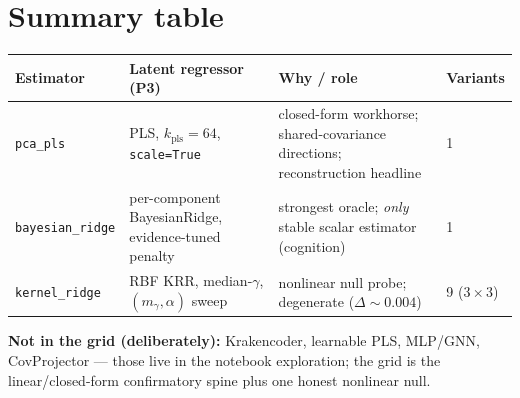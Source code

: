 \documentclass[11pt]{article}
\newcommand{\code}[1]{\texttt{#1}}
\begin{document}
\section*{Summary table}
\begin{center}
\renewcommand{\arraystretch}{1.3}
\begin{tabular}{@{}lp{3.3cm}p{6.0cm}p{2.4cm}@{}}
\toprule
\textbf{Estimator} & \textbf{Latent regressor (P3)} & \textbf{Why / role} & \textbf{Variants} \\
\midrule
\code{pca\_pls} & PLS, $k_{\mathrm{pls}}{=}64$, \texttt{scale=True} & closed-form workhorse; shared-covariance directions; reconstruction headline & 1 \\
\code{bayesian\_ridge} & per-component BayesianRidge, evidence-tuned penalty & strongest oracle; \emph{only} stable scalar estimator (cognition) & 1 \\
\code{kernel\_ridge} & RBF KRR, median-$\gamma$, $(m_\gamma,\alpha)$ sweep & nonlinear null probe; degenerate ($\Delta\!\sim\!0.004$) & 9 ($3\times3$) \\
\bottomrule
\end{tabular}
\end{center}

\noindent\textbf{Not in the grid (deliberately):} Krakencoder, learnable PLS, MLP/GNN,
CovProjector --- those live in the notebook exploration; the grid is the linear/closed-form
confirmatory spine plus one honest nonlinear null.
\end{document}
